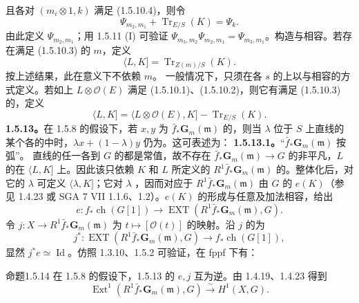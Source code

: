 且各对 $(m_i\otimes1,k)$ 满足 (1.5.10.4)，则令
\[\Psi_{m_2,m_1}+\operatorname{Tr}_{E/S}(K)=\Psi_k.\]
由此定义 $\Psi_{m_2,m_1}$；用 1.5.11 (I) 可验证 $\Psi_{m_3,m_2}\Psi_{m_2,m_1}=\Psi_{m_3,m_1}$。构造与相容。若存在满足 (1.5.10.3) 的 $m$，定义
\[\langle L,K]=\operatorname{Tr}_{Z(m)/S}(K).\]
按上述结果，此在意义下不依赖 $m$。
一般情况下，只须在各 $s$ 的上以与相容的方式定义。若如上 $L\otimes\mathcal O(E)$ 满足 (1.5.10.1)、(1.5.10.2)，则它有满足 (1.5.10.3) 的，定义
\[\langle L,K]=\langle L\otimes\mathcal O(E),K]-\operatorname{Tr}_{E/S}(K).\]
\textbf{1.5.13。}在 1.5.8 的假设下，若 $x,y$ 为 $\bar f_*\mathbf G_m(\mathfrak m)$ 的，则当 $\lambda$ 位于 $S$ 上直线的某个各的中时，$\lambda x+(1-\lambda)y$ 仍为。这可表述为：
\textbf{1.5.13.1。}“$\bar f_*\mathbf G_m(\mathfrak m)$ 按弧”。
直线的任一各到 $G$ 的都是常值，故不存在 $\bar f_*\mathbf G_m(\mathfrak m)\to G$ 的非平凡，$L$ 的在 $\langle L,K]$ 上。因此该只依赖 $K$ 和 $L$ 所定义的 $R^1\bar f_*\mathbf G_m(\mathfrak m)$ 的。整体化后，对它的 $\lambda$ 可定义 $\langle\lambda,K]$；它对 $\lambda$ ，因而对应于 $R^1\bar f_*\mathbf G_m(\mathfrak m)$ 由 $G$ 的 $e(K)$（参见 1.4.23 或 SGA 7 VII 1.1.6、1.2）。$e(K)$ 的形成与任意及加法相容，给出
\[e:f_*\operatorname{ch}(G[1])\to\operatorname{EXT}(R^1\bar f_*\mathbf G_m(\mathfrak m),G).\]
令 $j:X\to R^1\bar f_*\mathbf G_m(\mathfrak m)$ 为 $t\mapsto[\mathcal O(t)]$ 的映射。沿 $j$ 的为
\[j^*:\operatorname{EXT}(R^1\bar f_*\mathbf G_m(\mathfrak m),G)\to f_*\operatorname{ch}(G[1]),\]
显然 $j^*e\simeq\operatorname{Id}$。仿照 1.3.10、1.5.2 可验证，在 fppf 下有：
\begin{SGAresult}{命题}{1.5.14}
在 1.5.8 的假设下，1.5.13 的 $e,j$ 互为逆。由 1.4.19、1.4.23 得到
\[\operatorname{Ext}^1(R^1\bar f_*\mathbf G_m(\mathfrak m),G)\xrightarrow\sim H^1(X,G).\]
\end{SGAresult}
